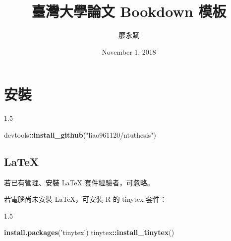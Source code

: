 \documentclass[oneside]{book}
\title{臺灣大學論文 Bookdown 模板}
\author{廖永賦}
\date{November 1, 2018}
\newenvironment{Shaded}{\begin{snugshade}}{\end{snugshade}}
\newcommand{\KeywordTok}[1]{\textcolor[rgb]{0.13,0.29,0.53}{\textbf{#1}}}
\newcommand{\StringTok}[1]{\textcolor[rgb]{0.31,0.60,0.02}{#1}}
\newcommand{\OperatorTok}[1]{\textcolor[rgb]{0.81,0.36,0.00}{\textbf{#1}}}
\newcommand{\NormalTok}[1]{#1}
\theoremstyle{definition}
\theoremstyle{definition}
\theoremstyle{definition}
\theoremstyle{remark}
\begin{document}


\clearpage
{}

{}


{}



{}


{}


\clearpage
{}

{
\setcounter{tocdepth}{1}
\tableofcontents
}

\newpage

\listoftables
\newpage
\listoffigures
\newpage

\let\oldShaded=\Shaded
\let\endoldShaded=\endShaded
\renewenvironment{Shaded}{
      \begin{spacing}{1.5}\begin{oldShaded}
    }
  {
  \end{oldShaded}
  \end{spacing}
  }


\chapter{安裝}\label{install}

\begin{Shaded}
\begin{Highlighting}[]
\NormalTok{devtools}\OperatorTok{::}\KeywordTok{install_github}\NormalTok{(}\StringTok{"liao961120/ntuthesis"}\NormalTok{)}
\end{Highlighting}
\end{Shaded}

\section{LaTeX}\label{latex}

若已有管理、安裝 LaTeX 套件經驗者，可忽略。

若電腦尚未安裝 LaTeX，可安裝 R 的 tinytex 套件：

\begin{Shaded}
\begin{Highlighting}[]
\KeywordTok{install.packages}\NormalTok{(}\StringTok{'tinytex'}\NormalTok{)}
\NormalTok{tinytex}\OperatorTok{::}\KeywordTok{install_tinytex}\NormalTok{()}
\end{Highlighting}
\end{Shaded}
\end{document}
